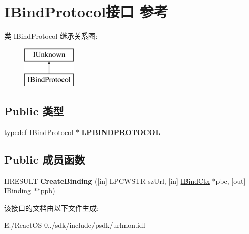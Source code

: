 \hypertarget{interface_i_bind_protocol}{}\section{I\+Bind\+Protocol接口 参考}
\label{interface_i_bind_protocol}
类 I\+Bind\+Protocol 继承关系图\+:\begin{figure}[H]
\begin{center}
\leavevmode
\includegraphics[height=2.000000cm]{interface_i_bind_protocol}
\end{center}
\end{figure}
\subsection*{Public 类型}
\begin{DoxyCompactItemize}
\item 
\mbox{\label{interface_i_bind_protocol_af3e50383b36404f3e0acfd853d57b8ad}} 
typedef \hyperlink{interface_i_bind_protocol}{I\+Bind\+Protocol} $\ast$ {\bfseries L\+P\+B\+I\+N\+D\+P\+R\+O\+T\+O\+C\+OL}
\end{DoxyCompactItemize}
\subsection*{Public 成员函数}
\begin{DoxyCompactItemize}
\item 
\mbox{\label{interface_i_bind_protocol_a22c1bea0a1845de58bce6a4d4008b685}} 
H\+R\+E\+S\+U\+LT {\bfseries Create\+Binding} (\mbox{[}in\mbox{]} L\+P\+C\+W\+S\+TR sz\+Url, \mbox{[}in\mbox{]} \hyperlink{interface_i_bind_ctx}{I\+Bind\+Ctx} $\ast$pbc, \mbox{[}out\mbox{]} \hyperlink{interface_i_binding}{I\+Binding} $\ast$$\ast$ppb)
\end{DoxyCompactItemize}


该接口的文档由以下文件生成\+:\begin{DoxyCompactItemize}
\item 
E\+:/\+React\+O\+S-\/0../sdk/include/psdk/urlmon.\+idl\end{DoxyCompactItemize}
